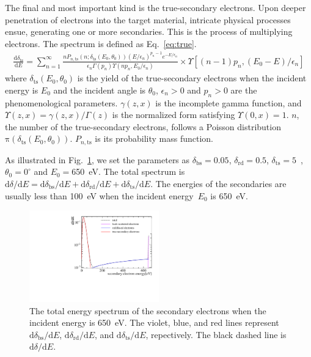 The final and most important kind is the true-secondary electrons.
Upon deeper penetration of electrons into the target material, intricate physical processes ensue,
generating one or more secondaries.
This is the process of multiplying electrons.
The spectrum is defined as Eq.~\eqref{eq:true}.
\begin{equation}
	\label{eq:true}
	\begin{aligned}
		\frac{\mathrm{d} \delta_{\mathrm{ts}}}{\mathrm{d} E}=  \sum_{n=1}^{\infty}
		\frac{n P_{n,\mathrm{ts}}\left(n; \delta_{\mathrm{ts}}(E_0,\theta_0)\right)
		\left(E / \epsilon_{n}\right)^{p_{n}-1} e^{-E / \epsilon_{n}}}
		{\epsilon_{n} \Gamma\left(p_{n}\right) \Upsilon\left(n p_{n}, E_0 / \epsilon_{n}\right)}
		\times \Upsilon\left[(n-1) p_{n},\left(E_0-E\right) / \epsilon_{n}\right]
	\end{aligned}
\end{equation}
where $\delta_{\mathrm{ts}}(E_0,\theta_0)$
is the yield of the true-secondary electrons when the incident energy is $E_0$ and the incident angle is $\theta_0$,
$\epsilon_{n}>0$ and $p_{n}>0$ are the phenomenological parameters.
$\gamma(z,x)$ is the incomplete gamma function,
and $\Upsilon(z,x)=\gamma(z,x)/\Gamma(z)$ is the normalized form satisfying $\Upsilon(0,x)=1$.
$n$, the number of the true-secondary electrons, follows a Poisson distribution~$\mathrm{\pi}(\delta_{\mathrm{ts}}(E_0,\theta_0))$.
$P_{n,\mathrm{ts}}$ is its probability mass function.

As illustrated in Fig.~\ref{fig:SES}, we set the parameters as
$\delta_{\mathrm{bs}}=0.05$, $\delta_{\mathrm{rd}}=0.5$, $\delta_{\mathrm{ts}}=5$~\cite{2021Effects},
$\theta_0=0^\circ$  and $E_0=$\SI{650}{eV}.
The total spectrum is
$\mathrm{d}\delta/\mathrm{d}E=\mathrm{d}\delta_{\mathrm{bs}}/\mathrm{d}E+\mathrm{d}\delta_{\mathrm{rd}}/\mathrm{d}E+\mathrm{d}\delta_{\mathrm{ts}}/\mathrm{d}E$.
The energies of the secondaries are usually less than \SI{100}{eV} when the incident energy~$E_0$ is \SI{650}{eV}.
\begin{figure}[!htbp]
	\centering
	\includegraphics[width=0.5\textwidth]{PMTRelated/GTmodel/SES.pdf}
	\caption{The total energy spectrum of the secondary electrons when the incident energy is \SI{650}{eV}.
		The violet, blue, and red lines represent $\mathrm{d}\delta_{\mathrm{bs}}/\mathrm{d}E$, $\mathrm{d}\delta_{\mathrm{rd}}/\mathrm{d}E$, and
		$\mathrm{d}\delta_{\mathrm{ts}}/\mathrm{d}E$, repectively.
		The black dashed line is $\mathrm{d}\delta/\mathrm{d}E$.}
	\label{fig:SES}
\end{figure}

